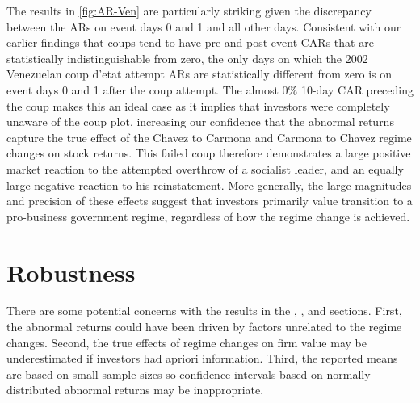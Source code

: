 \documentclass[12pt,final,fleqn]{article}
\theoremstyle{plain}
\begin{document}
The results in \autoref{fig:AR-Ven} are particularly striking given the discrepancy between the ARs on event days 0 and 1 and all other days. Consistent with our earlier findings that coups tend to have pre and post-event CARs that are statistically indistinguishable from zero, the only days on which the 2002 Venezuelan coup d'etat attempt ARs are statistically different from zero is on event days 0 and 1 after the coup attempt. The almost 0\% 10-day CAR preceding the coup makes this an ideal case as it implies that investors were completely unaware of the coup plot, increasing our confidence that the abnormal returns capture the true effect of the Chavez to Carmona and Carmona to Chavez regime changes on stock returns. This failed coup therefore demonstrates a large positive market reaction to the attempted overthrow of a socialist leader, and an equally large negative reaction to his reinstatement. More generally, the large magnitudes and precision of these effects suggest that  investors primarily value transition to a pro-business government regime, regardless of how the regime change is achieved. 


\section{Robustness} \label{subsec: Robustness}

There are some potential concerns with the results in the , , and  sections. First, the abnormal returns could have been driven by factors unrelated to the regime changes.  Second, the true effects of regime changes on firm value may be underestimated if investors had apriori information. Third, the reported means are based on small sample sizes so confidence intervals based on normally distributed abnormal returns may be inappropriate.
\end{document}
